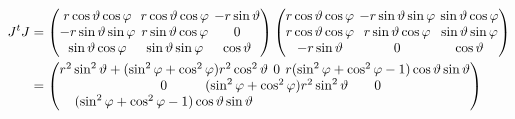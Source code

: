 \begin{beispiel}
\begin{align*}
J^tJ
&=
\renewcommand{\arraycolsep}{2pt}
\begin{pmatrix}
r\cos\vartheta\cos\varphi
&r\cos\vartheta\cos\varphi
&-r\sin\vartheta
\\
-r\sin\vartheta\sin\varphi
&r\sin\vartheta\cos\varphi
&0
\\
\sin\vartheta\cos\varphi
&\sin\vartheta\sin\varphi
&\cos\vartheta
\end{pmatrix}
\begin{pmatrix}
r\cos\vartheta\cos\varphi
&-r\sin\vartheta\sin\varphi
&\sin\vartheta\cos\varphi
\\
r\cos\vartheta\cos\varphi
&r\sin\vartheta\cos\varphi
&\sin\vartheta\sin\varphi
\\
-r\sin\vartheta
&0
&\cos\vartheta
\end{pmatrix}
\\
&=
\begin{pmatrix}
r^2\sin^2\vartheta + (\sin^2\varphi+\cos^2\varphi) r^2\cos^2\vartheta
& 0
& r(\sin^2\varphi+\cos^2\varphi-1)\cos\vartheta\sin\vartheta
\\
0
&\clap{$(\sin^2\varphi+\cos^2\varphi)r^2\sin^2\vartheta$}
&0
\\
(\sin^2\varphi+\cos^2\varphi -1)\cos\vartheta\sin\vartheta

\end{pmatrix}
\end{align*}
\end{beispiel}
